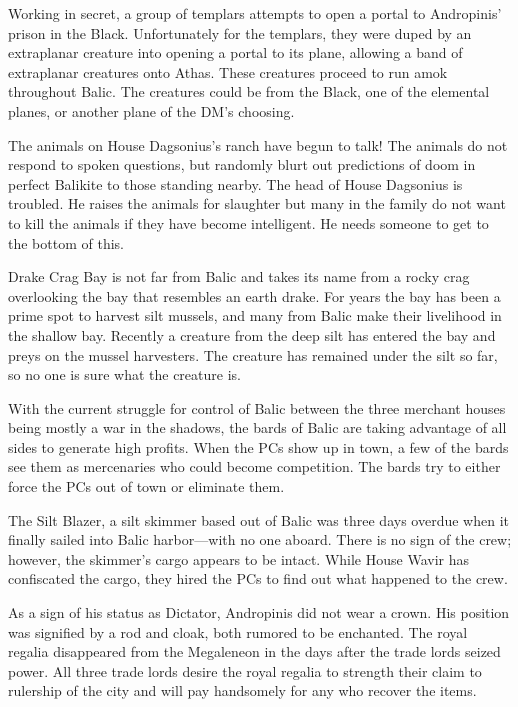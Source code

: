 {
	\item Working in secret, a group of templars attempts to open a portal to Andropinis' prison in the Black. Unfortunately for the templars, they were duped by an extraplanar creature into opening a portal to its plane, allowing a band of extraplanar creatures onto Athas. These creatures proceed to run amok throughout Balic. The creatures could be from the Black, one of the elemental planes, or another plane of the DM's choosing.
	\item The animals on House Dagsonius's ranch have begun to talk! The animals do not respond to spoken questions, but randomly blurt out predictions of doom in perfect Balikite to those standing nearby. The head of House Dagsonius is troubled. He raises the animals for slaughter but many in the family do not want to kill the animals if they have become intelligent. He needs someone to get to the bottom of this.
	\item Drake Crag Bay is not far from Balic and takes its name from a rocky crag overlooking the bay that resembles an earth drake. For years the bay has been a prime spot to harvest silt mussels, and many from Balic make their livelihood in the shallow bay. Recently a creature from the deep silt has entered the bay and preys on the mussel harvesters. The creature has remained under the silt so far, so no one is sure what the creature is.
	\item With the current struggle for control of Balic between the three merchant houses being mostly a war in the shadows, the bards of Balic are taking advantage of all sides to generate high profits. When the PCs show up in town, a few of the bards see them as mercenaries who could become competition. The bards try to either force the PCs out of town or eliminate them.
	\item The Silt Blazer, a silt skimmer based out of Balic was three days overdue when it finally sailed into Balic harbor---with no one aboard. There is no sign of the crew; however, the skimmer's cargo appears to be intact. While House Wavir has confiscated the cargo, they hired the PCs to find out what happened to the crew.
	\item As a sign of his status as Dictator, Andropinis did not wear a crown. His position was signified by a rod and cloak, both rumored to be enchanted. The royal regalia disappeared from the Megaleneon in the days after the trade lords seized power. All three trade lords desire the royal regalia to strength their claim to rulership of the city and will pay handsomely for any who recover the items.
}